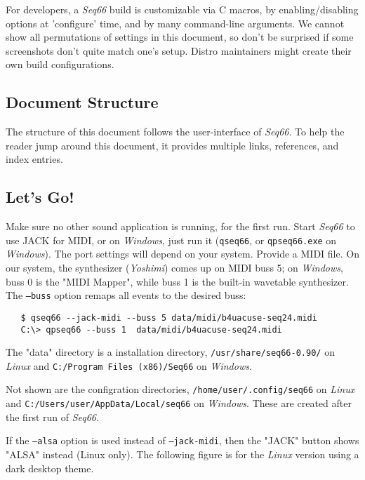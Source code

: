 \documentclass[
 11pt,
 twoside,
 a4paper,
 headinclude,
 footinclude,
 final                                 %
]{article}
\begin{document}
   For developers, a \textsl{Seq66} build is customizable via C macros,
   by enabling/disabling options at 'configure' time, and by many
   command-line arguments.  We cannot show all permutations of settings in this
   document, so don't be surprised if some screenshots don't quite match
   one's setup.  Distro maintainers might create their own build
   configurations.

\subsection{Document Structure}
\label{subsec:introduction_document_structure}

   The structure of this document follows the user-interface of
   \textsl{Seq66}.
   To help the reader jump around this document, it provides
   multiple links, references, and index entries.

\subsection{Let's Go!}
\label{subsec:introduction_lets_get_started}

   Make sure no other sound application is running, for the first run.
   Start \textsl{Seq66} to use JACK for MIDI, or
   on \textsl{Windows}, just run it (\texttt{qseq66}, or \texttt{qpseq66.exe}
   on \textsl{Windows}).
   The port settings will depend on your system.  Provide a MIDI file.
   On our system, the synthesizer (\textsl{Yoshimi}) comes up on MIDI buss 5;
   on \textsl{Windows}, buss 0 is the "MIDI Mapper", while buss 1 is the
   built-in wavetable synthesizer.
   The \texttt{--buss} option remaps all events to the desired buss:

\begin{verbatim}
   $ qseq66 --jack-midi --buss 5 data/midi/b4uacuse-seq24.midi
   C:\> qpseq66 --buss 1  data/midi/b4uacuse-seq24.midi
\end{verbatim}

   The "data" directory is a installation directory,
   \texttt{/usr/share/seq66-0.90/} on \textsl{Linux} and
   \texttt{C:/Program Files (x86)/Seq66} on \textsl{Windows}.

   Not shown are the configration directories,
   \texttt{/home/user/.config/seq66} on \textsl{Linux} and
   \texttt{C:/Users/user/AppData/Local/seq66} on \textsl{Windows}.
   These are created after the first run of \textsl{Seq66}.

   If the \texttt{--alsa} option is used instead of
   \texttt{--jack-midi}, then the "JACK" button shows "ALSA" instead
   (Linux only).  The following figure is for the \textsl{Linux}
   version using a dark desktop theme.
\end{document}
